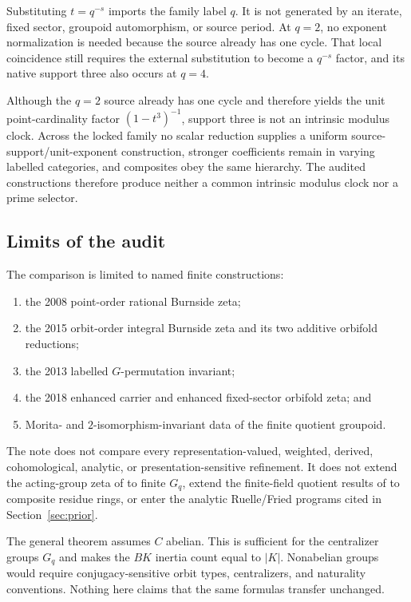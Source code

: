 \documentclass[11pt]{article}
\theoremstyle{definition}
\theoremstyle{remark}
\begin{document}
Substituting \(t=q^{-s}\) imports the family label \(q\).  It is not generated
by an iterate, fixed sector, groupoid automorphism, or source period.  At
\(q=2\), no exponent normalization is needed because the source already has
one cycle.  That local coincidence still requires the external substitution
to become a \(q^{-s}\) factor, and its native support three also occurs at
\(q=4\).

Although the \(q=2\) source already has one cycle and therefore yields the
unit point-cardinality factor \((1-t^3)^{-1}\), support three is not an
intrinsic modulus clock.  Across the locked family no scalar reduction
supplies a uniform source-support/unit-exponent construction, stronger
coefficients remain in varying labelled categories, and composites obey the
same hierarchy.  The audited constructions therefore produce neither a
common intrinsic modulus clock nor a prime selector.

\subsection{Limits of the audit}

The comparison is limited to named finite constructions:
\begin{enumerate}
  \item the 2008 point-order rational Burnside zeta;
  \item the 2015 orbit-order integral Burnside zeta and its two additive
        orbifold reductions;
  \item the 2013 labelled \(G\)-permutation invariant;
  \item the 2018 enhanced carrier and enhanced fixed-sector orbifold zeta;
        and
  \item Morita- and \(2\)-isomorphism-invariant data of the finite quotient
        groupoid.
\end{enumerate}
The note does not compare every representation-valued, weighted, derived,
cohomological, analytic, or presentation-sensitive refinement.  It does not
extend the acting-group zeta of \citet{Miles2017} to finite \(G_q\), extend
the finite-field quotient results of \citet{Walton2018} to composite residue
rings, or enter the analytic Ruelle/Fried programs cited in
Section~\ref{sec:prior}.

The general theorem assumes \(C\) abelian.  This is sufficient for the
centralizer groups \(G_q\) and makes the \(BK\) inertia count equal to
\(|K|\).  Nonabelian groups would require conjugacy-sensitive orbit types,
centralizers, and naturality conventions.  Nothing here claims that the
same formulas transfer unchanged.
\end{document}
